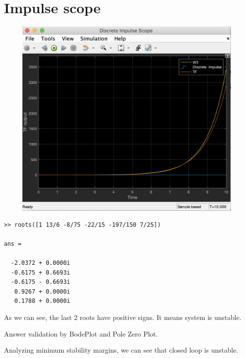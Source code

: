 \documentclass[a4paper,11pt]{article}
\makeatletter
\newcommand{\problemtitle}[1]{\gdef\@problemtitle{#1}}%
\newcommand{\problemquestion}[1]{\gdef\@problemquestion{#1}}%
\newcommand{\problemsolution}[1]{\gdef\@problemsolution{#1}}%
\theoremstyle{mytheor}
\makeatother
\begin{document}
\section*{Impulse scope}
\includegraphics[width=15cm, height=10cm]{impulse_2.png}


\begin{problem}
  \problemtitle{Part C}
  \problemquestion{For one of the inputs (write down what you choose) generate a Bode and Pole-Zero map plots. Put plots and result - stable or unstable is system and why - in the report.}
  \problemsolution{
  Definition of stability for our problem:
  $$Stable: f(t) \to 0, t \to \infty$$
  $$f(t) = L^{-1}(tf)$$
  $L^{-1}$ is inverse Laplace transform.
  
  From this rule, all roots of inverse denominator should be negative.
  
  If we calculate roots of denominator of total TF using matlab:
  }
\end{problem}
\begin{lstlisting}
>> roots([1 13/6 -8/75 -22/15 -197/150 7/25])

ans =

  -2.0372 + 0.0000i
  -0.6175 + 0.6693i
  -0.6175 - 0.6693i
   0.9267 + 0.0000i
   0.1788 + 0.0000i
\end{lstlisting}
  
  As we can see, the last 2 roots have positive signs. It means system is unstable.
  
  Answer validation by BodePlot and Pole Zero Plot.
  
  Analyzing minimum stability margins, we can see that closed loop is unstable.
\end{document}
